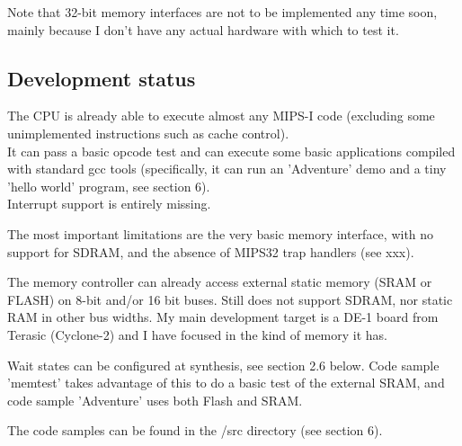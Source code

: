 \documentclass[11pt]{article}
\begin{document}
    
    Note that 32-bit memory interfaces are not to be implemented any time soon, 
    mainly because I don't have any actual hardware with which to test it.
    

\subsection{Development status}
\label{status}

    The CPU is already able to execute almost any MIPS-I code (excluding some
    unimplemented instructions such as cache control).\\
    It can pass a basic opcode test and can execute some basic applications 
    compiled with standard gcc tools (specifically, it can run an 'Adventure' 
    demo and a tiny 'hello world' program, see section 6).\\
    
    Interrupt support is entirely missing.
    
    The most important limitations are the very basic memory interface, with
    no support for SDRAM, and the absence of MIPS32 trap handlers (see xxx).
    
    The memory controller can already access external static memory (SRAM or 
    FLASH) on 8-bit and/or 16 bit buses. Still does not support SDRAM, nor 
    static RAM in other bus widths.
    My main development target is a DE-1 board from Terasic (Cyclone-2) and I 
    have focused in the kind of memory it has.
    
    Wait states can be configured at synthesis, see section 2.6 below.
    Code sample 'memtest' takes advantage of this to do a basic test of the
    external SRAM, and code sample 'Adventure' uses both Flash and SRAM.
    

    The code samples can be found in the /src directory (see section 6).
\end{document}
